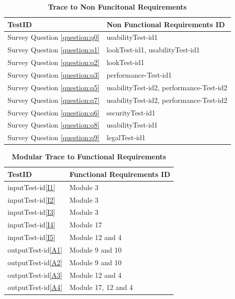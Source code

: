 \documentclass[12pt, titlepage]{article}
\begin{document}
\begin{table}[ht]
\caption{\bf Trace to Non Funcitonal Requirements}
\label{TraceNFR}
\begin{tabularx}{\textwidth}{p{5cm}p{8cm}}
\toprule {\bf TestID} & {\bf Non Functional Requirements ID}\\
\midrule
Survey Question \ref{question:q0} & usabilityTest-id1\\
Survey Question \ref{question:q1} & lookTest-id1, usabilityTest-id1\\
Survey Question \ref{question:q2} & lookTest-id1\\
Survey Question \ref{question:q3} & performance-Test-id1\\
Survey Question \ref{question:q5} & usabilityTest-id2, performance-Test-id2\\
Survey Question \ref{question:q7} & usabilityTest-id2, performance-Test-id2\\
Survey Question \ref{question:q6} & securityTest-id1\\
Survey Question \ref{question:q8} & usabilityTest-id1\\
Survey Question \ref{question:q9} & legalTest-id1\\
\bottomrule
\end{tabularx}
\end{table}

\begin{table}[ht]
\caption{\bf Modular Trace to Functional Requirements}
\label{ModuleTraceFR}
\begin{tabularx}{\textwidth}{p{5cm}p{8cm}}
\toprule {\bf TestID} & {\bf Functional Requirements ID}\\
\midrule
inputTest-id\ref{I1} & Module 3\\
inputTest-id\ref{I2} & Module 3\\
inputTest-id\ref{I3} &  Module 3\\
inputTest-id\ref{I4} & Module 17\\
inputTest-id\ref{I5} & Module 12 and 4\\
outputTest-id\ref{A1} & Module 9 and 10\\
outputTest-id\ref{A2} & Module 9 and 10\\
outputTest-id\ref{A3} & Module 12 and 4\\
outputTest-id\ref{A4} & Module 17, 12 and 4\\
\bottomrule
\end{tabularx}
\end{table}




\end{document}
